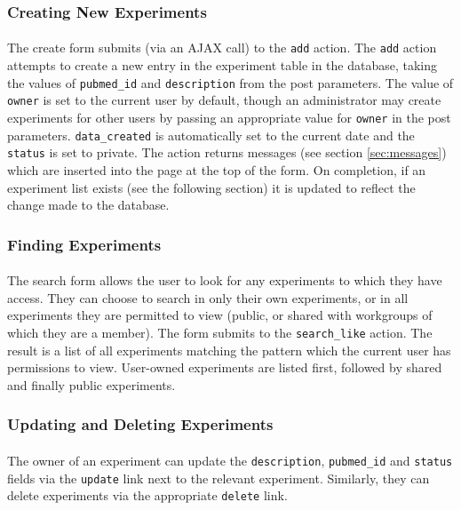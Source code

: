 \subsubsection{Creating New Experiments}

\paragraph{}
The create form submits (via an AJAX call) to the \texttt{add} action. The \texttt{add} action attempts to create a new entry in the experiment table in the database, taking the values of \texttt{pubmed\_id} and \texttt{description} from the post parameters. The value of \texttt{owner} is set to the current user by default, though an administrator may create experiments for other users by passing an appropriate value for \texttt{owner} in the post parameters. \texttt{data\_created} is automatically set to the current date and the \texttt{status} is set to private. The action returns messages (see section \ref{sec:messages}) which are inserted into the page at the top of the form. On completion, if an experiment list exists (see the following section) it is updated to reflect the change made to the database.


\subsubsection{Finding Experiments}

\paragraph{}
The search form allows the user to look for any experiments to which they have access. They can choose to search in only their own experiments, or in all experiments they are permitted to view (public, or shared with workgroups of which they are a member). The form submits to the \texttt{search\_like} action. The result is a list of all experiments matching the pattern which the current user has permissions to view. User-owned experiments are listed first, followed by shared and finally public experiments.


\subsubsection{Updating and Deleting Experiments}

\paragraph{}
The owner of an experiment can update the \texttt{description}, \texttt{pubmed\_id} and \texttt{status} fields via the \texttt{update} link next to the relevant experiment. Similarly, they can delete experiments via the appropriate \texttt{delete} link.

